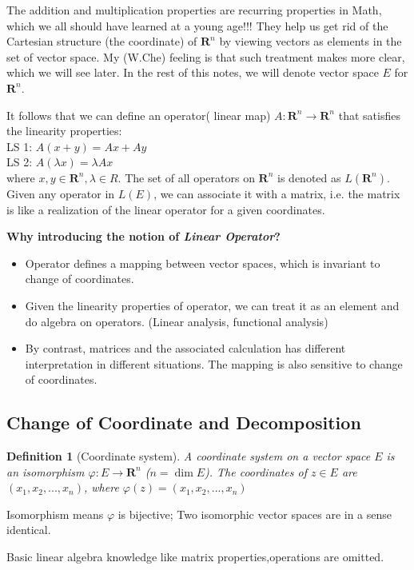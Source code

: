 \documentclass[12pt,oneside]{book}
\newtheorem{definition}{Definition}[section]
\begin{document}
    The addition and multiplication properties are recurring properties in Math, which we all should have learned at a young age!!! They help us get rid of the Cartesian structure (the coordinate) of $\mathbf{R}^n$ by viewing vectors as elements in the set of vector space. My (W.Che) feeling is that such treatment makes more clear, which we will see later. In the rest of this notes, we will denote vector space $E$ for $\mathbf{R}^n$.
    
    It follows that we can define an operator( linear map) $A:\mathbf{R}^n\rightarrow\mathbf{R}^n$ that satisfies the linearity properties:\\
  LS 1: \(A(x+y)=Ax+Ay\)\\
  LS 2: \(A(\lambda x)=\lambda Ax\)\\
  where $x,y\in\mathbf{R}^n,\lambda\in R$. The set of all operators on $\mathbf{R}^n$ is denoted as $L(\mathbf{R}^n)$. Given any operator in $L(E)$, we can associate it with a matrix, i.e. the matrix is like a realization of the linear operator for a given coordinates.
    	
	\textbf{Why introducing the notion of \textit{Linear Operator}?}
	\begin{itemize}
		\item Operator defines a mapping between vector spaces, which is invariant to change of coordinates.
		\item Given the linearity properties of operator, we can treat it as an element and do algebra on operators. (Linear analysis, functional analysis)
		\item By contrast, matrices and the associated calculation has different interpretation in different situations. The mapping is also sensitive to change of coordinates.
	\end{itemize}

\subsection{Change of Coordinate and Decomposition}
	\begin{definition}[Coordinate system]
		A \textit{coordinate system} on a vector space $E$ is an isomorphism $\varphi:E\rightarrow\mathbf{R}^n$ ($n=\dim E$). The coordinates of $z\in E$ are $(x_1,x_2,...,x_n)$, where $\varphi(z)=(x_1,x_2,...,x_n)$
	\end{definition}
 	Isomorphism means $\varphi$ is bijective; Two isomorphic vector spaces are in a sense identical.
	
	Basic linear algebra knowledge like matrix properties,operations are omitted.
\end{document}
